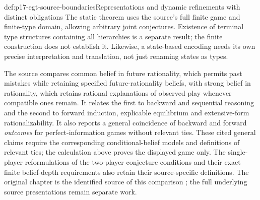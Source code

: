 \begin{proofboundary}{def:p17-egt-source-boundaries}{Representations and dynamic refinements with distinct obligations}
The static theorem uses the source's full finite game and finite-type
domain, allowing arbitrary joint conjectures. Existence of terminal
type structures containing all hierarchies is a separate result;
the finite construction does not establish it. Likewise, a
state-based encoding needs its own precise interpretation and
translation, not just renaming states as types.

The source compares common belief in future rationality, which permits
past mistakes while retaining specified future-rationality beliefs,
with strong belief in rationality, which retains rational explanations
of observed play whenever compatible ones remain. It relates the first
to backward and sequential reasoning and the second to forward
induction, explicable equilibrium and extensive-form rationalizability.
It also reports a general coincidence of backward and forward
\emph{outcomes} for perfect-information games without relevant ties.
These cited general claims require the corresponding conditional-belief
models and definitions of relevant ties; the calculation above proves
the displayed game only. The single-player reformulations of the
two-player conjecture conditions and their exact finite belief-depth
requirements also retain their source-specific definitions.
The original chapter is the identified source of this comparison
\cite[pp.~545, 548--550]{Perea2021EpistemicGameTheory};
the full underlying source presentations remain separate work.
\end{proofboundary}

